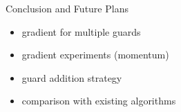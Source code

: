 \documentclass{beamer}
\begin{document}
\begin{frame}{Conclusion and Future Plans}
	\begin{itemize}
		\item gradient for multiple guards
		\pause
		\item gradient experiments (momentum)
		\pause
		\item guard addition strategy
		\pause
		\item comparison with existing algorithms \cite{DBLP:journals/corr/abs-2007-06920}
	\end{itemize}
\end{frame}
\end{document}

